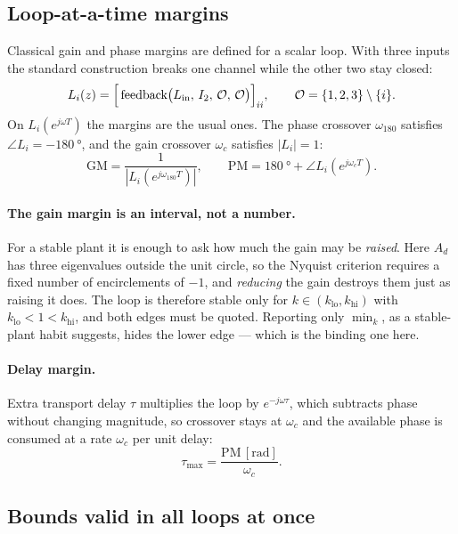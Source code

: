 \subsection{Loop-at-a-time margins}

Classical gain and phase margins are defined for a scalar loop. With three inputs
the standard construction breaks one channel while the other two stay closed:
\begin{equation}
  L_i(z)=\Bigl[\,\text{feedback}\bigl(L_{\mathrm{in}},\,I_{2},\,\mathcal{O},\,\mathcal{O}\bigr)\Bigr]_{ii},
  \qquad \mathcal{O}=\{1,2,3\}\setminus\{i\}.
\end{equation}
On $L_i(e^{j\omega T})$ the margins are the usual ones. The phase crossover
$\omega_{180}$ satisfies $\angle L_i=-\SI{180}{\degree}$, and the gain crossover
$\omega_c$ satisfies $|L_i|=1$:
\begin{equation}
  \mathrm{GM}=\frac{1}{|L_i(e^{j\omega_{180}T})|},
  \qquad
  \mathrm{PM}=\SI{180}{\degree}+\angle L_i(e^{j\omega_cT}).
\end{equation}

\paragraph{The gain margin is an interval, not a number.} For a stable plant it is
enough to ask how much the gain may be \emph{raised}. Here $A_d$ has three
eigenvalues outside the unit circle, so the Nyquist criterion requires a fixed
number of encirclements of $-1$, and \emph{reducing} the gain destroys them just as
raising it does. The loop is therefore stable only for
$k\in(k_{\mathrm{lo}},k_{\mathrm{hi}})$ with $k_{\mathrm{lo}}<1<k_{\mathrm{hi}}$, and
both edges must be quoted. Reporting only $\min_k$, as a stable-plant habit
suggests, hides the lower edge --- which is the binding one here.

\paragraph{Delay margin.} Extra transport delay $\tau$ multiplies the loop by
$e^{-j\omega\tau}$, which subtracts phase without changing magnitude, so crossover
stays at $\omega_c$ and the available phase is consumed at a rate $\omega_c$ per
unit delay:
\begin{equation}
  \tau_{\max}=\frac{\mathrm{PM}\,[\si{\radian}]}{\omega_c}.
  \label{eq:delaymargin}
\end{equation}

\subsection{Bounds valid in all loops at once}

